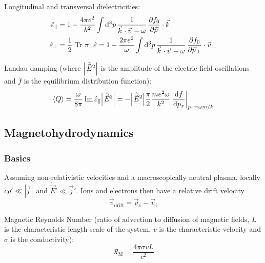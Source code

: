 			\noindent
			Longitudinal and transversal dielectricities:
			\begin{equation}
				\begin{aligned}
					\hat{\varepsilon}_{\parallel} &= 1-\frac{4\pi e^{2}}{k^{2}}\int{\mathrm d^{3}}p\,\frac{1}{\vec{k}\cdot\vec{v}-\omega}\,\frac{\partial f_{0}}{\partial\vec{p}}\cdot\vec{k}\\
					\hat{\varepsilon}_{\perp} &= \frac{1}{2}\,\tr\,\pi_{\perp}\hat{\varepsilon}=1-\frac{2\pi e^{2}}{\omega}\int\mathrm{d}^{3}p\,\frac{1}{\vec{k}\cdot\vec{v}-\omega}\,\frac{\partial f_{0}}{\partial\vec{p}_{\perp}}\cdot\vec{v}_{\perp}
				\end{aligned}
			\end{equation}

			\noindent
			Landau damping (where $\abs{\hat{\vec{E}}^2}$ is the amplitude of the electric field oscillations and $\bar{f}$ is the equilibrium distribution function):
			\begin{equation}
				\avg{Q}
				= \frac{\omega}{8 \pi} \Im \hat{\varepsilon}_\parallel \abs{\hat{\vec{E}}^2}
				= - \abs{\hat{\vec{E}}^2} \frac{\pi}{2} \frac{m e^2 \omega}{k^2} \eval{\dv{\bar{f}}{p_x}}_{p_x = \omega m /k}
			\end{equation}

	\subsection{Magnetohydrodynamics}
		\subsubsection{Basics}
			Assuming non-relativistic velocities and a macroscopically neutral plasma, \ie locally $c\rho' \ll \abs{\vec{j}}$ and $\dot{\vec{E}}' \ll \vec{j}'$.
			Ions and electrons then have a relative drift velocity
			\begin{equation}
				\vec{v}_{\text{drift}} = \vec{v}_e - \vec{v}_i
			\end{equation}

			\noindent
			Magnetic Reynolds Number (ratio of advection to diffusion of magnetic fields, $L$ is the characteristic length scale of the system, $v$ is the characteristic velocity and $\sigma$ is the conductivity):
			\begin{equation}
				\mathcal{R}_\text{M} = \frac{4\pi\sigma v L}{c^2}
			\end{equation}

